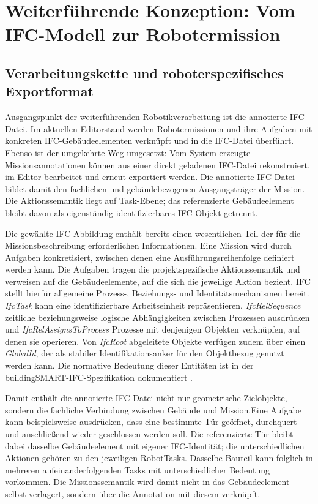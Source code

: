 
\section{Weiterführende Konzeption: Vom IFC-Modell zur Robotermission}\label{sec:Weiterführung}
\subsection{Verarbeitungskette und roboterspezifisches Exportformat}

Ausgangspunkt der weiterführenden Robotikverarbeitung ist die annotierte IFC-Datei. Im aktuellen
Editorstand werden Robotermissionen und ihre Aufgaben mit konkreten IFC-Gebäudeelementen verknüpft
und in die IFC-Datei überführt. Ebenso ist der umgekehrte Weg umgesetzt: Vom System erzeugte
Missionsannotationen können aus einer direkt geladenen IFC-Datei rekonstruiert, im Editor bearbeitet
und erneut exportiert werden. Die annotierte IFC-Datei bildet damit den fachlichen und
gebäudebezogenen Ausgangsträger der Mission. Die Aktionssemantik liegt auf Task-Ebene; das
referenzierte Gebäudeelement bleibt davon als eigenständig identifizierbares IFC-Objekt getrennt.

Die gewählte IFC-Abbildung enthält bereits einen wesentlichen Teil der für die Missionsbeschreibung
erforderlichen Informationen. Eine Mission wird durch Aufgaben konkretisiert, zwischen denen eine
Ausführungsreihenfolge definiert werden kann. Die Aufgaben tragen die projektspezifische
Aktionssemantik und verweisen auf die Gebäudeelemente, auf die sich die jeweilige Aktion bezieht.
IFC stellt hierfür allgemeine Prozess-, Beziehungs- und Identitätsmechanismen bereit.
\textit{IfcTask} kann eine identifizierbare Arbeitseinheit repräsentieren, \textit{IfcRelSequence}
zeitliche beziehungsweise logische Abhängigkeiten zwischen Prozessen ausdrücken und
\textit{IfcRelAssignsToProcess} Prozesse mit denjenigen Objekten verknüpfen, auf denen sie
operieren. Von \textit{IfcRoot} abgeleitete Objekte verfügen zudem über einen \textit{GlobalId}, der
als stabiler Identifikationsanker für den Objektbezug genutzt werden kann. Die normative Bedeutung
dieser Entitäten ist in der buildingSMART-IFC-Spezifikation dokumentiert
\parencite{buildingsmart2024ifc43}.

Damit enthält die annotierte IFC-Datei nicht nur geometrische Zielobjekte, sondern die fachliche
Verbindung zwischen Gebäude und Mission.Eine Aufgabe kann beispielsweise ausdrücken, dass eine
bestimmte Tür geöffnet, durchquert und anschließend wieder geschlossen werden soll. Die
referenzierte Tür bleibt dabei dasselbe Gebäudeelement mit eigener IFC-Identität; die
unterschiedlichen Aktionen gehören zu den jeweiligen RobotTasks. Dasselbe Bauteil kann folglich in
mehreren aufeinanderfolgenden Tasks mit unterschiedlicher Bedeutung vorkommen. Die Missionssemantik
wird damit nicht in das Gebäudeelement selbst verlagert, sondern über die Annotation mit diesem
verknüpft.


